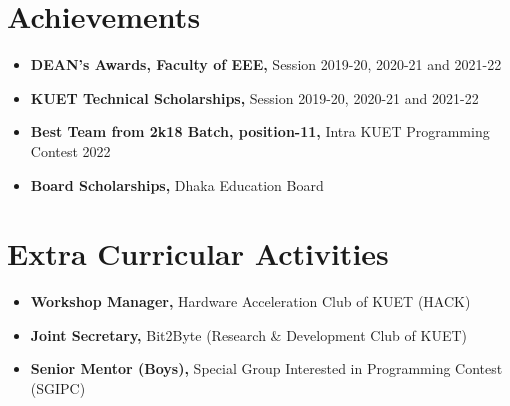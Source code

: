 \documentclass[letterpaper,11pt]{article}
\newcommand{\resumeItemListStart}{\begin{itemize}[leftmargin=0.15in]}
\newcommand{\resumeItemListEnd}{\end{itemize}}
\newcommand{\resumeItem}[1]{\item {#1}}
\begin{document}
\section{Achievements}
 \resumeItemListStart
    \resumeItem{\textbf{DEAN’s Awards, Faculty of EEE, } Session 2019-20, 2020-21 and 2021-22}
    \vspace{-6pt}

    \resumeItem{\textbf{KUET Technical Scholarships, } Session 2019-20, 2020-21 and 2021-22}
    \vspace{-6pt}

    \resumeItem{\textbf{Best Team from 2k18 Batch, position-11, } Intra KUET Programming Contest 2022}
    \vspace{-6pt}

    \resumeItem{\textbf{Board Scholarships, } Dhaka Education Board}
\resumeItemListEnd

\section{Extra Curricular Activities}
\resumeItemListStart
    \resumeItem{\textbf{Workshop Manager, } Hardware Acceleration Club of KUET (HACK)}
    \vspace{-6pt}
    \resumeItem{\textbf{Joint Secretary, } Bit2Byte (Research \& Development Club of KUET)}
    \vspace{-6pt}
    \resumeItem{\textbf{Senior Mentor (Boys), } Special Group Interested in Programming Contest (SGIPC)}
\resumeItemListEnd

\end{document}
